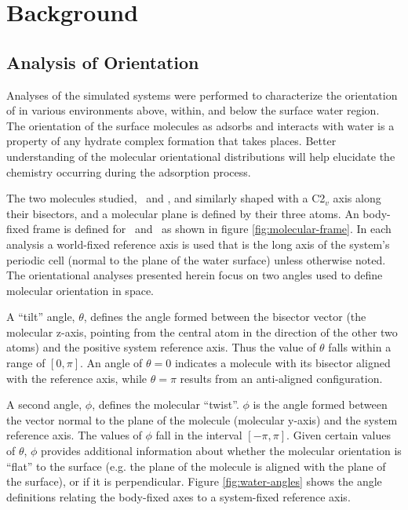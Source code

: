 \section{Background}

\subsection{Analysis of Orientation}

	Analyses of the simulated systems were performed to characterize the orientation of \suldiox in various environments above, within, and below the surface water region. The orientation of the surface molecules as \suldiox adsorbs and interacts with water is a property of any hydrate complex formation that takes places. Better understanding of the molecular orientational distributions will help elucidate the chemistry occurring during the adsorption process.

	The two molecules studied, \wat~and \suldiox, and similarly shaped with a C2$_v$ axis along their bisectors, and a molecular plane is defined by their three atoms. An body-fixed frame is defined for \wat~and \suldiox~as shown in figure \ref{fig:molecular-frame}. In each analysis a world-fixed reference axis is used that is the long axis of the system's periodic cell (normal to the plane of the water surface) unless otherwise noted. The orientational analyses presented herein focus on two angles used to define molecular orientation in space. 
	
	A ``tilt'' angle, $\theta$, defines the angle formed between the bisector vector (the molecular z-axis, pointing from the central atom in the direction of the other two atoms) and the positive system reference axis. Thus the value of $\theta$ falls within a range of $[0,\pi]$. An angle of $\theta=0$ indicates a molecule with its bisector aligned with the reference axis, while $\theta=\pi$ results from an anti-aligned configuration. 
	
	A second angle, $\phi$, defines the molecular ``twist''. $\phi$ is the angle formed between the vector normal to the plane of the molecule (molecular y-axis) and the system reference axis. The values of $\phi$ fall in the interval $[-\pi,\pi]$. Given certain values of $\theta$, $\phi$ provides additional information about whether the molecular orientation is ``flat'' to the surface (e.g. the plane of the molecule is aligned with the plane of the surface), or if it is perpendicular. %
	Figure \ref{fig:water-angles} shows the angle definitions relating the body-fixed axes to a system-fixed reference axis. 

